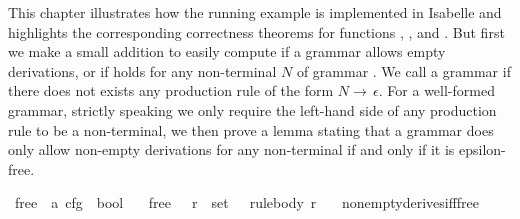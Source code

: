 %
\begin{isabellebody}%
%
%
\isadelimtheory
%
\endisadelimtheory
%
\isatagtheory
%
\endisatagtheory
{\isafoldtheory}%
%
\isadelimtheory
%
\endisadelimtheory
%
\isadelimdocument
%
\endisadelimdocument
%
\isatagdocument
%
\isamarkuptrue%
%
\endisatagdocument
{\isafolddocument}%
%
\isadelimdocument
%
\endisadelimdocument
%
\begin{isamarkuptext}%
This chapter illustrates how the running example is implemented in Isabelle and highlights
the corresponding correctness theorems for functions , , and
. But first we make a small addition to easily compute if a grammar allows empty
derivations, or if  holds for any non-terminal $N$ of grammar \isa{{\isasymG}}. We call
a grammar  if there does not exists any production rule of the form $N \rightarrow \, \epsilon$.
For a well-formed grammar, strictly speaking we only require the left-hand side of any production rule
to be a non-terminal, we then prove a lemma stating that a grammar does only allow non-empty derivations
for any non-terminal if and only if it is epsilon-free.%
\end{isamarkuptext}\isamarkuptrue%
\isamarkupfalse%
\ {\isasymepsilon}{\isacharunderscore}{\kern0pt}free\ {\isacharcolon}{\kern0pt}{\isacharcolon}{\kern0pt}\ {\isachardoublequoteopen}{\isacharprime}{\kern0pt}a\ cfg\ {\isasymRightarrow}\ bool{\isachardoublequoteclose}\ \isanewline
\ \ {\isachardoublequoteopen}{\isasymepsilon}{\isacharunderscore}{\kern0pt}free\ {\isasymG}\ {\isasymequiv}\ {\isasymforall}r\ {\isasymin}\ set\ {\isacharparenleft}{\kern0pt}{\isasymRR}\ {\isasymG}{\isacharparenright}{\kern0pt}{\isachardot}{\kern0pt}\ rule{\isacharunderscore}{\kern0pt}body\ r\ {\isasymnoteq}\ {\isacharbrackleft}{\kern0pt}{\isacharbrackright}{\kern0pt}{\isachardoublequoteclose}\isanewline
\isanewline
{}\isamarkupfalse%
\ nonempty{\isacharunderscore}{\kern0pt}derives{\isacharunderscore}{\kern0pt}iff{\isacharunderscore}{\kern0pt}{\isasymepsilon}{\isacharunderscore}{\kern0pt}free{\isacharcolon}{\kern0pt}\isanewline

\end{isabellebody}
